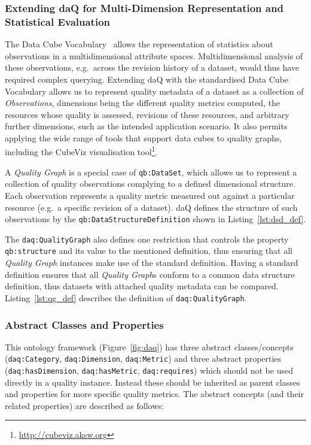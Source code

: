 \subsubsection{Extending daQ for Multi-Dimension Representation and Statistical Evaluation}
The Data Cube Vocabulary~\cite{w3c:REC-vocab-data-cube-20140116} allows the representation of statistics about observations in a multidimensional attribute spaces. 
Multidimensional analysis of these observations, e.g.\ across the revision history of a dataset, would thus have required complex querying.
Extending daQ with the standardised Data Cube Vocabulary allows us to represent quality metadata of a dataset as a collection of \emph{Observations}, dimensions being the different quality metrics computed, the resources whose quality is assessed, revisions of these resources, and arbitrary further dimensions, such as the intended application scenario.
It also permits applying the wide range of tools that support data cubes to quality graphs, including the  CubeViz visualisation tool\footnote{\url{http://cubeviz.aksw.org}}.

A \emph{Quality Graph} is a special case of \texttt{qb:DataSet}, which allows us to represent a collection of quality observations complying to  a defined dimensional structure.
Each observation represents a quality metric measured out against a particular resource (e.g.\ a specific revision of a dataset).
daQ defines the structure of such observations by the \texttt{qb:DataStructureDefinition} shown in Listing~\ref{lst:dsd_def}.


The \texttt{daq:QualityGraph} also defines one restriction that controls the property \texttt{qb:structure} and its value to the mentioned definition, thus ensuring that all \emph{Quality Graph} instances make use of the standard definition.
Having a standard definition ensures that all \emph{Quality Graph}s conform to a common data structure definition, thus datasets with attached quality metadata can be compared.
Listing~\ref{lst:qg_def} describes the definition of \texttt{daq:QualityGraph}.


\subsubsection{Abstract Classes and Properties}
This ontology framework (Figure~\ref{fig:daq}) has three abstract classes/concepts (\texttt{daq:Category}, \texttt{daq:Dimension}, \texttt{daq:Metric}) and three abstract properties (\texttt{daq:hasDimension}, \texttt{daq:hasMetric}, \texttt{daq:requires}) which should not be used directly in a quality instance.
Instead these should be inherited as parent classes and properties for more specific quality metrics.
The abstract concepts (and their related properties) are described as follows:

